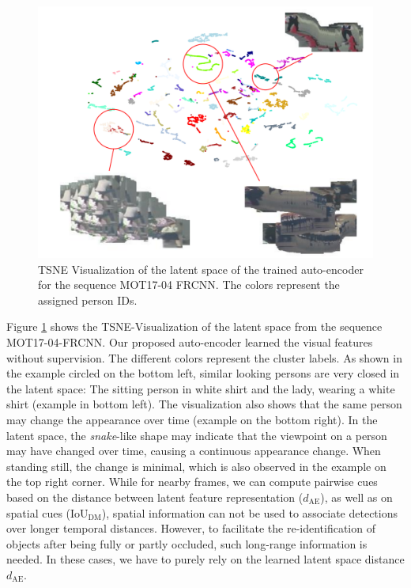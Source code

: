 \begin{figure}[!t]
	\begin{center}
		\includegraphics[width=0.9\linewidth]{Fig_5_figure.pdf}
	\end{center}
	\caption{TSNE Visualization of the latent space of the trained auto-encoder for the sequence MOT17-04 FRCNN. The colors represent the assigned person IDs.}
	\label{fig:graph4}
	
\end{figure}

Figure \ref{fig:graph4} shows the TSNE-Visualization \cite{maaten2008visualizing} of the latent space from the sequence MOT17-04-FRCNN. 
Our proposed auto-encoder learned the visual features without supervision. 
The different colors represent the cluster labels. 
As shown in the example circled on the bottom left, similar looking persons are very closed in the latent space: The sitting person in white shirt and the lady, wearing a white shirt (example in bottom left).
The visualization also shows that the same person may change the appearance over time (example on the bottom right). 
In the latent space, the \textit{snake}-like shape may indicate that the viewpoint on a person may have changed over time, causing a continuous appearance change. 
When standing still, the change is minimal, which is also observed in the example on the top right corner.
While for nearby frames, we can compute pairwise cues based on the distance between latent feature representation ($d_{\mathrm{AE}}$), as well as on spatial cues (IoU$_{\mathrm{DM}}$), spatial information can not be used to associate detections over longer temporal distances. 
However, to facilitate the re-identification of objects after being fully or partly occluded, such long-range information is needed.
In these cases, we have to purely rely on the learned latent space distance $d_{\mathrm{AE}}$. 


